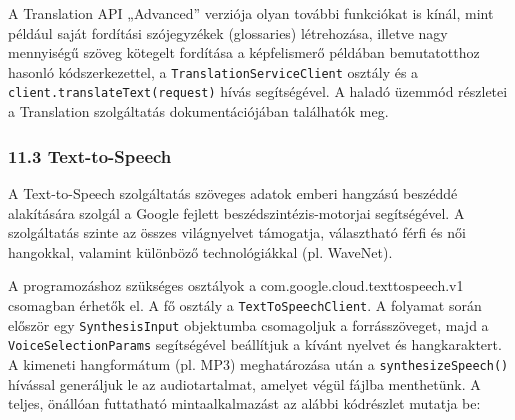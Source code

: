 \documentclass[
]{article}
\begin{document}
A Translation API „Advanced'' verziója olyan további funkciókat is
kínál, mint például saját fordítási szójegyzékek (glossaries)
létrehozása, illetve nagy mennyiségű szöveg kötegelt fordítása a
képfelismerő példában bemutatotthoz hasonló kódszerkezettel, a
\texttt{TranslationServiceClient} osztály és a
\texttt{client.translateText(request)} hívás segítségével. A haladó
üzemmód részletei a Translation szolgáltatás dokumentációjában
találhatók meg.

\hypertarget{text-to-speech}{%
\subsubsection{11.3 Text-to-Speech}\label{text-to-speech}}

A Text-to-Speech szolgáltatás szöveges adatok emberi hangzású beszéddé
alakítására szolgál a Google fejlett beszédszintézis-motorjai
segítségével. A szolgáltatás szinte az összes világnyelvet támogatja,
választható férfi és női hangokkal, valamint különböző technológiákkal
(pl. WaveNet).

A programozáshoz szükséges osztályok a com.google.cloud.texttospeech.v1
csomagban érhetők el. A fő osztály a \texttt{TextToSpeechClient}. A
folyamat során először egy \texttt{SynthesisInput} objektumba
csomagoljuk a forrásszöveget, majd a \texttt{VoiceSelectionParams}
segítségével beállítjuk a kívánt nyelvet és hangkaraktert. A kimeneti
hangformátum (pl. MP3) meghatározása után a \texttt{synthesizeSpeech()}
hívással generáljuk le az audiotartalmat, amelyet végül fájlba
menthetünk. A teljes, önállóan futtatható mintaalkalmazást az alábbi
kódrészlet mutatja be:
\end{document}

